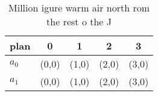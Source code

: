 \documentclass[a4paper]{article}
\begin{document}
\begin{table}
\begin{adjustbox}{width=0.7\columnwidth}
\begin{tabular}{|l|l|l|l|l|}
\hline
\textbf{plan} & \multicolumn{1}{c|}{\textbf{0}} & \multicolumn{1}{c|}{\textbf{1}} & \multicolumn{1}{c|}{\textbf{2}} & \multicolumn{1}{c|}{\textbf{3}} \\ \hline
\textbf{$a_0$}  & (0,0) & (1,0) & (2,0) & (3,0) \\ \hline
\textbf{$a_1$}  & (0,0) & (1,0) & (2,0) & (3,0) \\ \hline
\end{tabular}
\end{adjustbox}
\caption{Million igure warm air north rom the rest o the J
}
\end{table}
\end{document}
